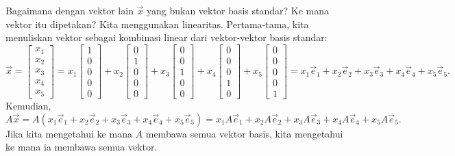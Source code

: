 Bagaimana dengan vektor lain $\vec{x}$ yang bukan vektor basis standar?
Ke mana vektor itu dipetakan? Kita menggunakan
linearitas. Pertama-tama, kita menuliskan vektor sebagai kombinasi linear dari vektor-vektor
basis standar:
\begin{equation*}
\vec{x} =
\begin{bmatrix}
x_1 \\ x_2 \\ x_3 \\ x_4 \\ x_5
\end{bmatrix}
=
x_1
\begin{bmatrix}
1 \\ 0 \\ 0 \\ 0 \\ 0
\end{bmatrix}
+
x_2
\begin{bmatrix}
0 \\ 1 \\ 0 \\ 0 \\ 0
\end{bmatrix}
+
x_3
\begin{bmatrix}
0 \\ 0 \\ 1 \\ 0 \\ 0
\end{bmatrix}
+
x_4
\begin{bmatrix}
0 \\ 0 \\ 0 \\ 1 \\ 0
\end{bmatrix}
+
x_5
\begin{bmatrix}
0 \\ 0 \\ 0 \\ 0 \\ 1
\end{bmatrix}
=
x_1 \vec{e}_1 +
x_2 \vec{e}_2 +
x_3 \vec{e}_3 +
x_4 \vec{e}_4 +
x_5 \vec{e}_5 .
\end{equation*}
Kemudian,
\begin{equation*}
A \vec{x}
=
A (
x_1 \vec{e}_1 +
x_2 \vec{e}_2 +
x_3 \vec{e}_3 +
x_4 \vec{e}_4 +
x_5 \vec{e}_5
)
=
x_1 A\vec{e}_1 +
x_2 A\vec{e}_2 +
x_3 A\vec{e}_3 +
x_4 A\vec{e}_4 +
x_5 A\vec{e}_5 .
\end{equation*}
Jika kita mengetahui ke mana $A$ membawa semua vektor basis, kita mengetahui ke mana ia membawa
semua vektor.

